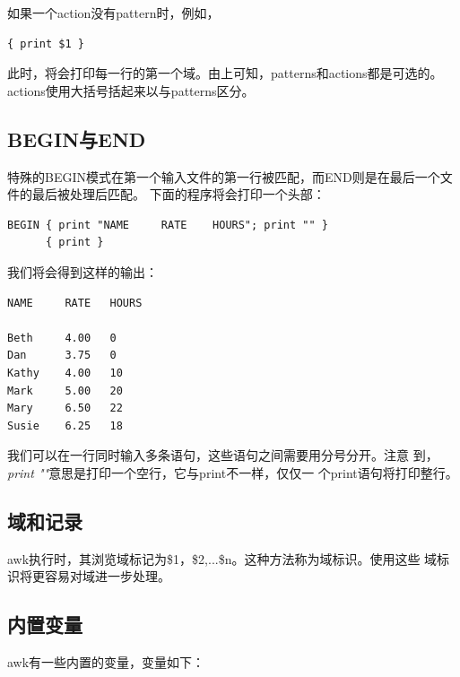 如果一个action没有pattern时，例如，

\begin{verbatim}
{ print $1 }
\end{verbatim}

此时，将会打印每一行的第一个域。由上可知，patterns和actions都是可选的。
actions使用大括号括起来以与patterns区分。

\subsection{BEGIN与END}

特殊的BEGIN模式在第一个输入文件的第一行被匹配，而END则是在最后一个文件的最后被处理后匹配。
下面的程序将会打印一个头部：

\begin{verbatim}
BEGIN { print "NAME     RATE    HOURS"; print "" }
      { print }
\end{verbatim}

我们将会得到这样的输出：

\begin{verbatim}
NAME     RATE   HOURS

Beth     4.00   0
Dan      3.75   0
Kathy    4.00   10
Mark     5.00   20
Mary     6.50   22
Susie    6.25   18
\end{verbatim}

我们可以在一行同时输入多条语句，这些语句之间需要用分号分开。注意
到，\textit{print ""}意思是打印一个空行，它与print不一样，仅仅一
个print语句将打印整行。

\subsection{域和记录}
\label{subsec:FieldRecordAwk}

awk执行时，其浏览域标记为\$1，\$2,...\$n。这种方法称为域标识。使用这些
域标识将更容易对域进一步处理。

\subsection{内置变量}

awk有一些内置的变量，变量如下：

